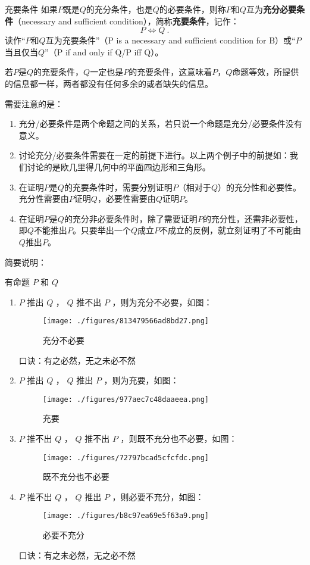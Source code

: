 \begin{definition}{充要条件}
如果$P$既是$Q$的充分条件，也是$Q$的必要条件，则称$P$和$Q$互为\textbf{充分必要条件}（necessary and sufficient condition），简称\textbf{充要条件}，记作：
\begin{equation}
P\Leftrightarrow Q~.
\end{equation}
读作“$P$和$Q$互为充要条件”（P is a necessary and sufficient condition for B）或“$P$当且仅当$Q$”（P if and only if Q/P iff Q）。
\end{definition}

若$P$是$Q$的充要条件，$Q$一定也是$P$的充要条件，这意味着$P$，$Q$命题等效，所提供的信息都一样，两者都没有任何多余的或者缺失的信息。

需要注意的是：
\begin{enumerate}
\item 充分/必要条件是两个命题之间的关系，若只说一个命题是充分/必要条件没有意义。
\item 讨论充分/必要条件需要在一定的前提下进行。以上两个例子中的前提如：我们讨论的是欧几里得几何中的平面四边形和三角形。
\item 在证明$P$是$Q$的充要条件时，需要分别证明$P$（相对于$Q$）的充分性和必要性。充分性需要由$P$证明$Q$，必要性需要由$Q$证明$P$。
\item 在证明$P$是$Q$的充分非必要条件时，除了需要证明$P$的充分性，还需非必要性，即$Q$不能推出$P$。只要举出一个$Q$成立$P$不成立的反例，就立刻证明了不可能由$Q$推出$P$。
\end{enumerate}

简要说明：

有命题 $P$ 和 $Q$ 
\begin{enumerate}
\item $P$ 推出 $Q$ ， $Q$ 推不出 $P$ ，则为充分不必要，如图：
\begin{figure}[ht]
\centering
\texttt{[image: ./figures/813479566ad8bd27.png]}
\caption{充分不必要} \label{fig_SufCnd_2}
\end{figure}
口诀：有之必然，无之未必不然
\item $P$ 推出 $Q$ ， $Q$ 推出 $P$ ，则为充要，如图：\begin{figure}[ht]
\centering
\texttt{[image: ./figures/977aec7c48daaeea.png]}
\caption{充要} \label{fig_SufCnd_3}
\end{figure}
\item $P$ 推不出 $Q$ ， $Q$ 推不出 $P$ ，则既不充分也不必要，如图：\begin{figure}[ht]
\centering
\texttt{[image: ./figures/72797bcad5cfcfdc.png]}
\caption{既不充分也不必要} \label{fig_SufCnd_4}
\end{figure}
\item $P$ 推不出 $Q$ ， $Q$ 推出 $P$ ，则必要不充分，如图：\begin{figure}[ht]
\centering
\texttt{[image: ./figures/b8c97ea69e5f63a9.png]}
\caption{必要不充分} \label{fig_SufCnd_5}
\end{figure}
口诀：有之未必然，无之必不然
\end {enumerate}

